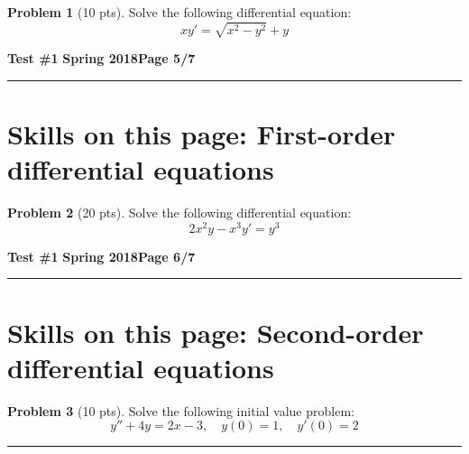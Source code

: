 \documentclass[12pt]{article}
\theoremstyle{definition}
\newtheorem{problem}{Problem}
\begin{document}
\begin{problem}[10 pts]
Solve the following differential equation:
\begin{equation*}
xy' = \sqrt{x^2-y^2} + y
\end{equation*}

\vspace{7.5cm}
\begin{flushright}
\end{flushright}
\end{problem}
\newpage


\hfill{\large\bf Test \#1}\hfill{\large\bf
Spring 2018}\hfill{\large\bf Page 5/7}\hrule

\section*{Skills on this page: First-order differential equations}

\begin{problem}[20 pts]
Solve the following differential equation:
\begin{equation*}
2x^2y-x^3y'=y^3
\end{equation*}

\vspace{18cm}
\begin{flushright}
\end{flushright}
\end{problem}
\newpage

\hfill{\large\bf Test \#1}\hfill{\large\bf
Spring 2018}\hfill{\large\bf Page 6/7}\hrule

\section*{Skills on this page: Second-order differential equations}
\begin{problem}[10 pts]
Solve the following initial value problem:
\begin{equation*}
y''+4y=2x-3, \quad y(0)= 1, \quad y'(0)=2
\end{equation*}

\vspace{6cm}
\begin{flushright}
\end{flushright}
\end{problem}
\hrule
\end{document}
